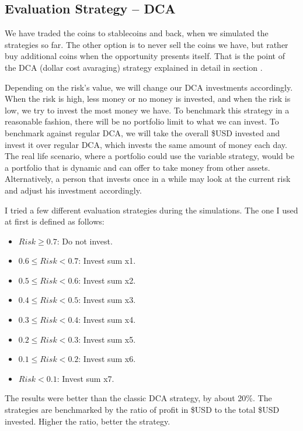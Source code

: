 \subsection*{Evaluation Strategy -- DCA}
\label{subsection-eval-dca}
We have traded the coins to stablecoins and back, when we simulated the strategies so far. The other option is to never sell the coins we have, but rather buy additional coins when the opportunity presents itself. That is the point of the DCA (dollar cost avaraging) strategy explained in detail in section \cite{section-dca}.

Depending on the risk's value, we will change our DCA investments accordingly. When the risk is high, less money or no money is invested, and when the risk is low, we try to invest the most money we have. To benchmark this strategy in a reasonable fashion, there will be no portfolio limit to what we can invest. To benchmark against regular DCA, we will take the overall \$USD invested and invest it over regular DCA, which invests the same amount of money each day. The real life scenario, where a portfolio could use the variable strategy, would be a portfolio that is dynamic and can offer to take money from other assets. Alternatively, a person that invests once in a while may look at the current risk and adjust his investment accordingly.

I tried a few different evaluation strategies during the simulations. The one I used at first is defined as follows:
\begin{itemize}
    \item $Risk \ge  0.7$: Do not invest.
    \item $0.6 \le Risk < 0.7$: Invest sum x1.
    \item $0.5 \le Risk < 0.6$: Invest sum x2.
    \item $0.4 \le Risk < 0.5$: Invest sum x3.
    \item $0.3 \le Risk < 0.4$: Invest sum x4.
    \item $0.2 \le Risk < 0.3$: Invest sum x5.
    \item $0.1 \le Risk < 0.2$: Invest sum x6.
    \item $Risk < 0.1$: Invest sum x7.
\end{itemize}

The results were better than the classic DCA strategy, by about 20\%. The strategies are benchmarked by the ratio of profit in \$USD to the total \$USD invested. Higher the ratio, better the strategy.


